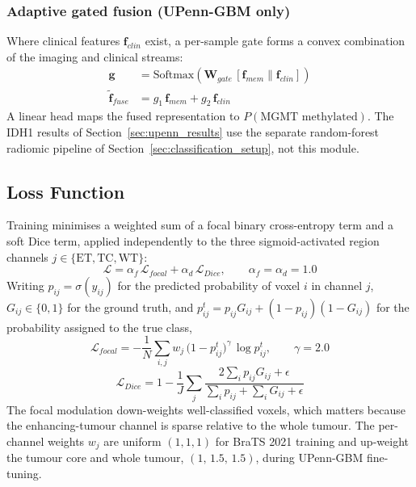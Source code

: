 \documentclass[conference]{IEEEtran}
\begin{document}
\subsubsection{Adaptive gated fusion (UPenn-GBM only)}
Where clinical features $\mathbf{f}_{clin}$ exist, a per-sample gate forms a convex combination of the imaging and clinical streams:
\begin{align}
\mathbf{g} &= \text{Softmax}(\mathbf{W}_{gate}\,[\mathbf{f}_{mem}\|\mathbf{f}_{clin}]) \\
\tilde{\mathbf{f}}_{fuse} &= g_1\,\mathbf{f}_{mem} + g_2\,\mathbf{f}_{clin}
\end{align}
A linear head maps the fused representation to $P(\text{MGMT methylated})$. The IDH1 results of Section~\ref{sec:upenn_results} use the separate random-forest radiomic pipeline of Section~\ref{sec:classification_setup}, not this module.

\subsection{Loss Function}

Training minimises a weighted sum of a focal binary cross-entropy term and a soft Dice term, applied independently to the three sigmoid-activated region channels $j\in\{\text{ET},\text{TC},\text{WT}\}$:
\begin{equation}
\mathcal{L} = \alpha_{f}\,\mathcal{L}_{focal} + \alpha_{d}\,\mathcal{L}_{Dice},
\qquad \alpha_{f}=\alpha_{d}=1.0
\end{equation}
Writing $p_{ij}=\sigma(\hat{y}_{ij})$ for the predicted probability of voxel $i$ in channel $j$, $G_{ij}\in\{0,1\}$ for the ground truth, and $p^{t}_{ij}=p_{ij}G_{ij}+(1-p_{ij})(1-G_{ij})$ for the probability assigned to the true class,
\begin{equation}
\mathcal{L}_{focal} = -\frac{1}{N}\sum_{i,j} w_j\,\big(1-p^{t}_{ij}\big)^{\gamma}\,\log p^{t}_{ij},
\qquad \gamma = 2.0
\end{equation}
\begin{equation}
\mathcal{L}_{Dice} = 1 - \frac{1}{J}\sum_{j}
\frac{2\sum_i p_{ij}G_{ij} + \epsilon}{\sum_i p_{ij} + \sum_i G_{ij} + \epsilon}
\end{equation}
The focal modulation down-weights well-classified voxels, which matters because the enhancing-tumour channel is sparse relative to the whole tumour. The per-channel weights $w_j$ are uniform $(1,1,1)$ for BraTS 2021 training and up-weight the tumour core and whole tumour, $(1,\,1.5,\,1.5)$, during UPenn-GBM fine-tuning.
\end{document}
